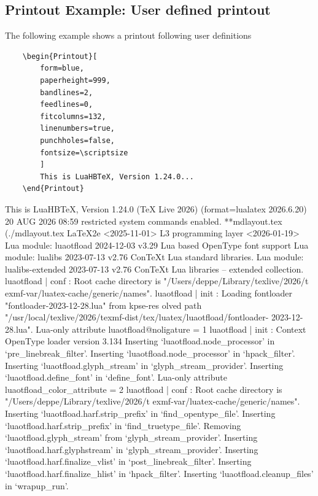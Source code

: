 \documentclass[
11pt,
a4paper,
oneside
]{scrbook}
\begin{document}
{\subsection{Printout Example: User defined printout}
The following example shows a printout following user definitions 
\begin{verbatim}
	\begin{Printout}[
		form=blue,
		paperheight=999,
		bandlines=2,
		feedlines=0,
		fitcolumns=132,
		linenumbers=true,
		punchholes=false,
		fontsize=\scriptsize
		]
		This is LuaHBTeX, Version 1.24.0...
	\end{Printout}
\end{verbatim}
\begin{Printout}[
	form=blue,
	paperheight=999,
	bandlines=2,
	feedlines=0,
	fitcolumns=132,
	linenumbers=true,
	punchholes=false,
	fontsize=\scriptsize
	]
This is LuaHBTeX, Version 1.24.0 (TeX Live 2026)  (format=lualatex 2026.6.20)  20 AUG 2026 08:59
restricted system commands enabled.
**mdlayout.tex
(./mdlayout.tex
LaTeX2e <2025-11-01>
L3 programming layer <2026-01-19>
Lua module: luaotfload 2024-12-03 v3.29 Lua based OpenType font support
Lua module: lualibs 2023-07-13 v2.76 ConTeXt Lua standard libraries.
Lua module: lualibs-extended 2023-07-13 v2.76 ConTeXt Lua libraries -- extended 
collection.
luaotfload | conf : Root cache directory is "/Users/deppe/Library/texlive/2026/t
exmf-var/luatex-cache/generic/names".
luaotfload | init : Loading fontloader "fontloader-2023-12-28.lua" from kpse-res
olved path "/usr/local/texlive/2026/texmf-dist/tex/luatex/luaotfload/fontloader-
2023-12-28.lua".
Lua-only attribute luaotfload@noligature = 1
luaotfload | init : Context OpenType loader version 3.134
Inserting `luaotfload.node_processor' in `pre_linebreak_filter'.
Inserting `luaotfload.node_processor' in `hpack_filter'.
Inserting `luaotfload.glyph_stream' in `glyph_stream_provider'.
Inserting `luaotfload.define_font' in `define_font'.
Lua-only attribute luaotfload_color_attribute = 2
luaotfload | conf : Root cache directory is "/Users/deppe/Library/texlive/2026/t
exmf-var/luatex-cache/generic/names".
Inserting `luaotfload.harf.strip_prefix' in `find_opentype_file'.
Inserting `luaotfload.harf.strip_prefix' in `find_truetype_file'.
Removing  `luaotfload.glyph_stream' from `glyph_stream_provider'.
Inserting `luaotfload.harf.glyphstream' in `glyph_stream_provider'.
Inserting `luaotfload.harf.finalize_vlist' in `post_linebreak_filter'.
Inserting `luaotfload.harf.finalize_hlist' in `hpack_filter'.
Inserting `luaotfload.cleanup_files' in `wrapup_run'.

\end{Printout}}
\end{document}
